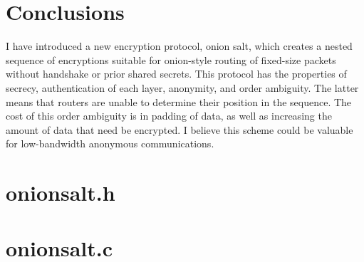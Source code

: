 \documentclass[letterpaper,twocolumn,amsmath,amssymb,pre,aps,10pt]{revtex4-1}
\begin{document}
\section{Conclusions}

I have introduced a new encryption protocol, onion salt, which creates
a nested sequence of encryptions suitable for onion-style routing of
fixed-size packets without handshake or prior shared secrets.  This
protocol has the properties of secrecy, authentication of each layer,
anonymity, and order ambiguity.  The latter means that routers are
unable to determine their position in the sequence.  The cost of this
order ambiguity is in padding of data, as well as increasing the
amount of data that need be encrypted.  I believe this scheme could be
valuable for low-bandwidth anonymous communications.




\appendix

\begin{widetext}

\section{onionsalt.h}



\section{onionsalt.c}



\end{widetext}
\end{document}
